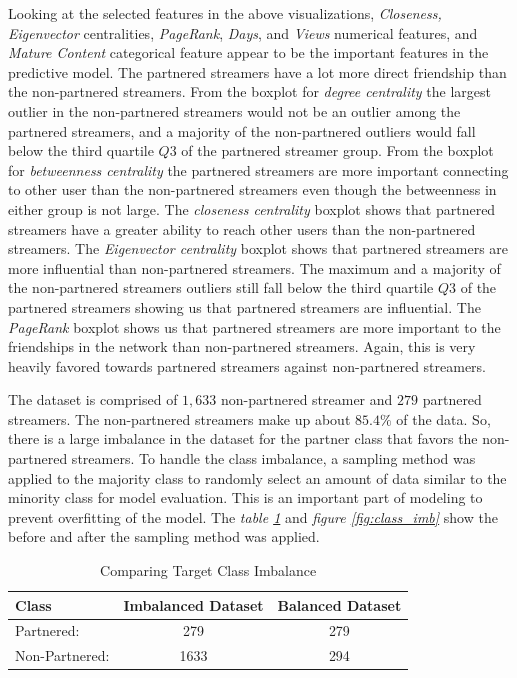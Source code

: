 \documentclass[10pt]{article}
\begin{document}
Looking at the selected features in the above visualizations,
\textit{Closeness, Eigenvector} centralities, \textit{PageRank},
\textit{Days}, and \textit{Views} numerical features, and
\textit{Mature Content} categorical feature appear to be the important
features in the predictive model.
The partnered streamers have a lot more direct friendship than the
non-partnered streamers. From the boxplot for \textit{degree centrality}
the largest outlier in the non-partnered streamers would not be an outlier
among the partnered streamers, and a majority of the non-partnered outliers
would fall below the third quartile $Q3$ of the partnered streamer group.
From the boxplot for \textit{betweenness centrality} the partnered streamers are
more important connecting to other user than the non-partnered streamers even
though the betweenness in either group is not large.
The \textit{closeness centrality} boxplot shows that partnered streamers have a
greater ability to reach other users than the non-partnered streamers.
The \textit{Eigenvector centrality} boxplot shows that partnered streamers are more
influential than non-partnered streamers. The maximum and a majority of the
non-partnered streamers outliers still fall below the third quartile $Q3$ of
the partnered streamers showing us that partnered streamers are influential.
The \textit{PageRank} boxplot shows us that partnered streamers are more important to
the friendships in the network than non-partnered streamers. Again, this is
very heavily favored towards partnered streamers against non-partnered
streamers.

The dataset is comprised of $1,633$ non-partnered streamer and $279$ partnered
streamers. The non-partnered streamers make up about $85.4\%$ of the data.
So, there is a large imbalance in the dataset for the partner
class that favors the non-partnered streamers. To handle the class
imbalance, a sampling method was applied to the majority class to randomly
select an amount of data similar to the minority class for model evaluation.
This is an important part of modeling to prevent overfitting of the model.
The \textit{table \ref{tab:class_imb}} and \textit{figure \ref{fig:class_imb}}
show the before and after the sampling method was applied.

\begin{table}[H]
\footnotesize
\centering
\begin{tabular}{l c|c}
\hline
    \bf{Class} & \bf{Imbalanced Dataset} & \bf{Balanced Dataset} \\
\hline
    Partnered: & 279 & 279 \\
    Non-Partnered: & 1633 & 294 \\
\hline
\end{tabular}
\caption{Comparing Target Class Imbalance}
\label{tab:class_imb}
\end{table}
\end{document}
